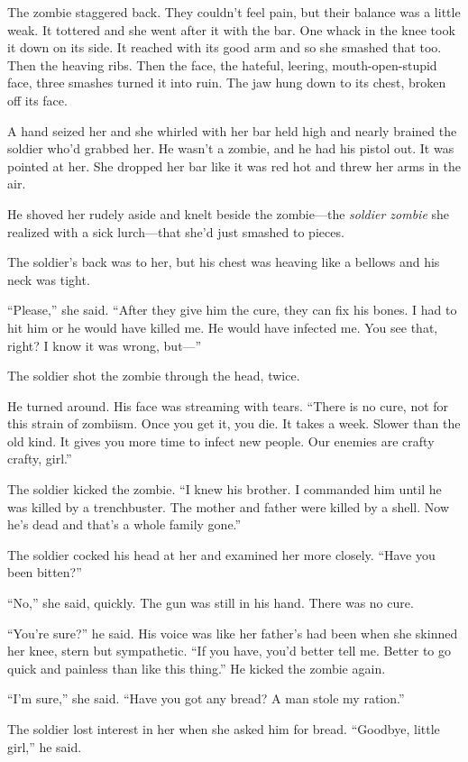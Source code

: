 The zombie staggered back. They couldn’t feel pain, but their
balance was a little weak. It tottered and she went after it with
the bar. One whack in the knee took it down on its side. It reached
with its good arm and so she smashed that too. Then the heaving
ribs. Then the face, the hateful, leering, mouth-open-stupid face,
three smashes turned it into ruin. The jaw hung down to its chest,
broken off its face.

A hand seized her and she whirled with her bar held high and nearly
brained the soldier who’d grabbed her. He wasn’t a zombie, and he
had his pistol out. It was pointed at her. She dropped her bar like
it was red hot and threw her arms in the air.

He shoved her rudely aside and knelt beside the zombie—the
\emph{soldier zombie} she realized with a sick lurch—that she’d
just smashed to pieces.

The soldier’s back was to her, but his chest was heaving like a
bellows and his neck was tight.

“Please,” she said. “After they give him the cure, they can fix his
bones. I had to hit him or he would have killed me. He would have
infected me. You see that, right? I know it was wrong, but—”

The soldier shot the zombie through the head, twice.

He turned around. His face was streaming with tears. “There is no
cure, not for this strain of zombiism. Once you get it, you die. It
takes a week. Slower than the old kind. It gives you more time to
infect new people. Our enemies are crafty crafty, girl.”

The soldier kicked the zombie. “I knew his brother. I commanded him
until he was killed by a trenchbuster. The mother and father were
killed by a shell. Now he’s dead and that’s a whole family gone.”

The soldier cocked his head at her and examined her more closely.
“Have you been bitten?”

“No,” she said, quickly. The gun was still in his hand. There was
no cure.

“You’re sure?” he said. His voice was like her father’s had been
when she skinned her knee, stern but sympathetic. “If you have,
you’d better tell me. Better to go quick and painless than like
this thing.” He kicked the zombie again.

“I’m sure,” she said. “Have you got any bread? A man stole my
ration.”

The soldier lost interest in her when she asked him for bread.
“Goodbye, little girl,” he said.


